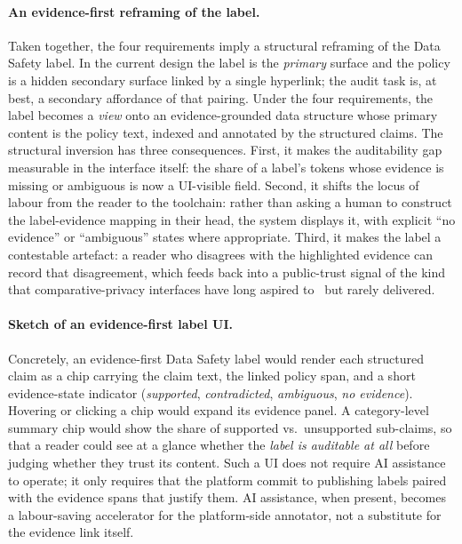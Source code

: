 \documentclass[11pt,a4paper]{article}
\begin{document}
\paragraph{An evidence-first reframing of the label.}
Taken together, the four requirements imply a structural reframing
of the Data Safety label. In the current design the label is the
\emph{primary} surface and the policy is a hidden secondary surface
linked by a single hyperlink; the audit task is, at best, a
secondary affordance of that pairing. Under the four requirements, the
label becomes a \emph{view} onto an evidence-grounded data structure
whose primary content is the policy text, indexed and annotated by the
structured claims. The structural inversion has three consequences.
First, it makes the auditability gap measurable in the interface
itself: the share of a label's tokens whose evidence is missing or
ambiguous is now a UI-visible field. Second, it shifts the locus of
labour from the reader to the toolchain: rather than asking a human
to construct the label-evidence mapping in their head, the system
displays it, with explicit ``no evidence'' or ``ambiguous'' states
where appropriate. Third, it makes the label a contestable artefact:
a reader who disagrees with the highlighted evidence can record that
disagreement, which feeds back into a public-trust signal of the kind
that comparative-privacy interfaces have long aspired
to~\citep{tsai2011effect,kelley2010standardizing} but rarely
delivered.

\paragraph{Sketch of an evidence-first label UI.}
Concretely, an evidence-first Data Safety label would render each
structured claim as a chip carrying the claim text, the linked policy
span, and a short evidence-state indicator (\emph{supported},
\emph{contradicted}, \emph{ambiguous}, \emph{no evidence}). Hovering
or clicking a chip would expand its evidence panel. A category-level
summary chip would show the share of supported vs.\ unsupported
sub-claims, so that a reader could see at a glance whether the
\emph{label is auditable at all} before judging whether they trust
its content. Such a UI does not require AI assistance to operate;
it only requires that the platform commit to publishing labels paired
with the evidence spans that justify them. AI assistance, when
present, becomes a labour-saving accelerator for the platform-side
annotator, not a substitute for the evidence link itself.
\end{document}
